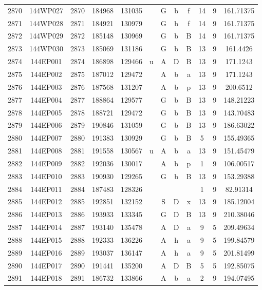 \begin{tabular}{|*{12}{c|}}
2870 & 144WP027 & 2870 & 184968 & 131035 &  & G & b & f & 14 & 9 & 161.71375 \\ 
2871 & 144WP028 & 2871 & 184921 & 130979 &  & G & b & f & 14 & 9 & 161.71375 \\ 
2872 & 144WP029 & 2872 & 185148 & 130969 &  & G & b & B & 14 & 9 & 161.71375 \\ 
2873 & 144WP030 & 2873 & 185069 & 131186 &  & G & b & B & 13 & 9 & 161.4426 \\ 
2874 & 144EP001 & 2874 & 186898 & 129466 & u & A & D & B & 13 & 9 & 171.1243 \\ 
2875 & 144EP002 & 2875 & 187012 & 129472 &  & A & b & a & 13 & 9 & 171.1243 \\ 
2876 & 144EP003 & 2876 & 187568 & 131207 &  & A & b & p & 13 & 9 & 200.6512 \\ 
2877 & 144EP004 & 2877 & 188864 & 129577 &  & G & b & B & 13 & 9 & 148.21223 \\ 
2878 & 144EP005 & 2878 & 188721 & 129472 &  & G & b & B & 13 & 9 & 143.70483 \\ 
2879 & 144EP006 & 2879 & 190846 & 131059 &  & G & b & B & 13 & 9 & 186.63022 \\ 
2880 & 144EP007 & 2880 & 191383 & 130929 &  & G & b & B & 5 & 9 & 155.49365 \\ 
2881 & 144EP008 & 2881 & 191558 & 130567 & u & A & b & a & 13 & 9 & 151.45479 \\ 
2882 & 144EP009 & 2882 & 192036 & 130017 &  & A & b & p & 1 & 9 & 106.00517 \\ 
2883 & 144EP010 & 2883 & 190930 & 129265 &  & G & b & B & 13 & 9 & 153.29388 \\ 
2884 & 144EP011 & 2884 & 187483 & 128326 &  &  &  &  & 1 & 9 & 82.91314 \\ 
2885 & 144EP012 & 2885 & 192851 & 132152 &  & S & D & x & 13 & 9 & 185.12004 \\ 
2886 & 144EP013 & 2886 & 193933 & 133345 &  & G & D & B & 13 & 9 & 210.38046 \\ 
2887 & 144EP014 & 2887 & 193140 & 135478 &  & A & D & a & 9 & 5 & 209.49634 \\ 
2888 & 144EP015 & 2888 & 192333 & 136226 &  & A & h & a & 9 & 5 & 199.84579 \\ 
2889 & 144EP016 & 2889 & 193037 & 136147 &  & A & h & a & 9 & 5 & 201.81499 \\ 
2890 & 144EP017 & 2890 & 191441 & 135200 &  & A & D & B & 5 & 5 & 192.85075 \\ 
2891 & 144EP018 & 2891 & 186732 & 133866 &  & A & b & a & 2 & 9 & 194.07495 \\ 

\end{tabular}
